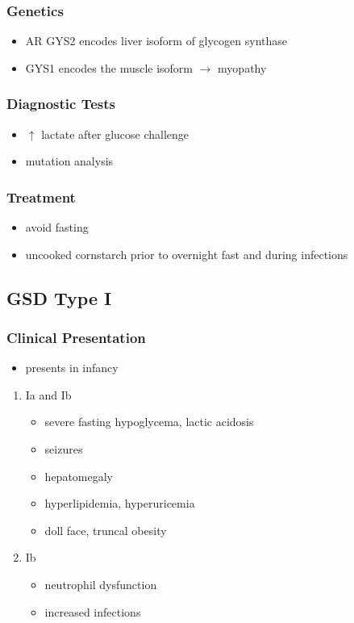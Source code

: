 \documentclass[12pt]{scrartcl}
\begin{document}
\subsubsection{Genetics}
\label{sec:orgd8c03ca}
\begin{itemize}
\item AR GYS2 encodes liver isoform of glycogen synthase
\item GYS1 encodes the muscle isoform \(\to\) myopathy
\end{itemize}
\subsubsection{Diagnostic Tests}
\label{sec:orgfbe238a}
\begin{itemize}
\item \(\uparrow\) lactate after glucose challenge
\item mutation analysis
\end{itemize}
\subsubsection{Treatment}
\label{sec:org3f60a4c}
\begin{itemize}
\item avoid fasting
\item uncooked cornstarch prior to overnight fast and during infections
\end{itemize}
\subsection{GSD Type I}
\label{sec:orgc4a6799}
\subsubsection{Clinical Presentation}
\label{sec:org120395a}
\begin{itemize}
\item presents in infancy
\end{itemize}
\begin{enumerate}
\item Ia and Ib
\label{sec:org8d87d4b}
\begin{itemize}
\item severe fasting hypoglycema, lactic acidosis
\item seizures
\item hepatomegaly
\item hyperlipidemia, hyperuricemia
\item doll face, truncal obesity
\end{itemize}
\item Ib
\label{sec:orge6b787c}
\begin{itemize}
\item neutrophil dysfunction
\item increased infections
\end{itemize}
\end{enumerate}
\end{document}
